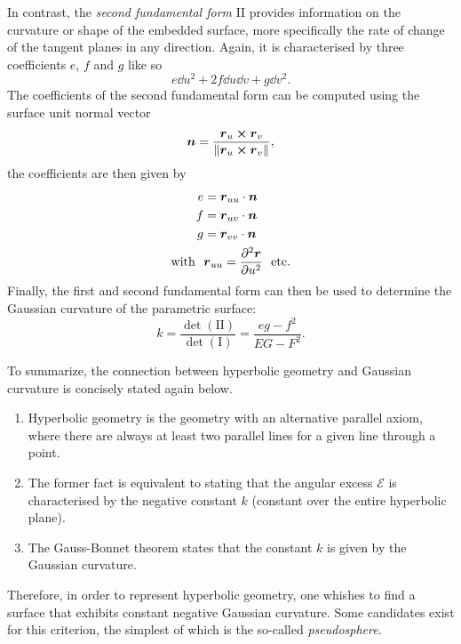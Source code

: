In contrast, the \emph{second fundamental form} II provides information on the curvature or shape of the embedded surface, more specifically the rate of change of the tangent planes in any direction. Again, it is characterised by three coefficients \(e\), \(f\) and \(g\) like so 
\[ e\dd{u}^2 + 2f\dd{u}\dd{v} + g\dd{v}^2. \]
The coefficients of the second fundamental form can be computed using the surface unit normal vector 
\begin{equation}
    \vb*{n} =  \frac{\vb*{r}_u \cross \vb*{r}_v}{\norm{\vb*{r}_u \cross \vb*{r}_v}},
    \label{eq:unit_normal}
\end{equation}
the coefficients are then given by
\begin{equation}
    \begin{split}
        e &= \vb*{r}_{uu} \cdot \vb*{n}\\
        f &= \vb*{r}_{uv} \cdot \vb*{n}\\
        g &= \vb*{r}_{vv} \cdot \vb*{n}\\
        \text{with }\ & \vb*{r}_{uu} = \pdv[2]{\vb*{r}}{u}\ \text{ etc.}
    \end{split}
    \label{eq:second_fform}
\end{equation}
Finally, the first and second fundamental form can then be used to determine the Gaussian curvature of the parametric surface: \cite{ONeill2006}
\begin{equation}
    k = \frac{\det(\mathrm{II})}{\det(\mathrm{I})} = \frac{eg - f^2}{EG - F^2}.
    \label{eq:gaussian_curv}
\end{equation}

To summarize, the connection between hyperbolic geometry and Gaussian curvature is concisely stated again below.
\begin{enumerate}
    \item Hyperbolic geometry is the geometry with an alternative parallel axiom, where there are always at least two parallel lines for a given line through a point.
    \item The former fact is equivalent to stating that the angular excess \(\mathcal{E}\) is characterised by the negative constant \(k\) (constant over the entire hyperbolic plane).
    \item The Gauss-Bonnet theorem states that the constant \(k\) is given by the Gaussian curvature.
\end{enumerate}
Therefore, in order to represent hyperbolic geometry, one whishes to find a surface that exhibits constant negative Gaussian curvature. Some candidates exist for this criterion, the simplest of which is the so-called \emph{pseudosphere}.

